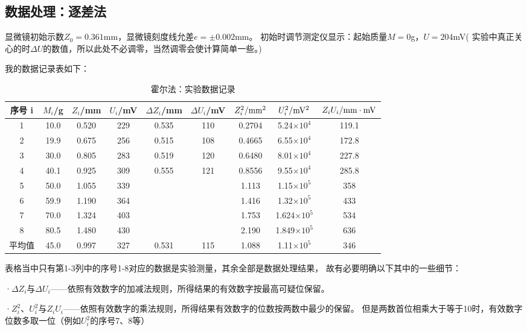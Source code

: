 \documentclass[11pt]{article}
\begin{document}
\subsection{数据处理：逐差法}

显微镜初始示数$Z_0=0.361$mm，显微镜刻度线允差$e=\pm 0.002$mm。
初始时调节测定仪显示：起始质量$M=0$g，$U=204$mV(
    实验中真正关心的时$\Delta U$的数值，所以此处不必调零，当然调零会使计算简单一些。)

我的数据记录表如下：
\begin{table}[H]
    \centering
    \begin{tabular}{ccccccccc}
        \toprule
        序号 i &  $M_i$/g  & $Z_i$/mm & $U_i$/mV& $\Delta Z_i$/mm 
        &$\Delta U_i$/mV &  $Z_i^2/\rm mm^2$ 
         &$U_i^2/\rm mV^2$ & $Z_iU_i/\rm mm\cdot mV$  \\ 
        \midrule
        1 & 10.0  & 0.520  & 229 & 0.535 & 110 & 0.2704 & 5.24$\times 10^4$  & 119.1 \\ 
        2 & 19.9  & 0.675  & 256 & 0.515 & 108 & 0.4665 &  6.55$\times 10^4$ & 172.8 \\ 
        3 & 30.0  & 0.805  & 283 & 0.519 & 120 & 0.6480 & 8.01$\times 10^4$ & 227.8 \\ 
        4 & 40.1  & 0.925  & 309 & 0.555 & 121 & 0.8556 & 9.55$\times 10^4$ & 285.8 \\ 
        5 & 50.0  & 1.055  & 339 & ~ & ~ & 1.113 & 1.15$\times 10^5$& 358 \\ 
        6 & 59.9  & 1.190  & 364 & ~ & ~ & 1.416 & 1.32$\times 10^5$ & 433 \\ 
        7 & 70.0  & 1.324  & 403 & ~ & ~ & 1.753 & 1.624$\times 10^5$  & 534 \\ 
        8 & 80.5  & 1.480  & 430 & ~ & ~ & 2.190 & 1.849$\times 10^5$ & 636 \\ 
        平均值 & 45.0 & 0.997 & 327 & 0.531 & 115 & 1.088& 1.11$\times 10^5$ & 346 \\ 
        \bottomrule
    \end{tabular}
    \caption{霍尔法：实验数据记录}
\end{table}

表格当中只有第1-3列中的序号1-8对应的数据是实验测量，其余全部是数据处理结果，
故有必要明确以下其中的一些细节：

·$\Delta Z_i$与$\Delta U_i$——依照有效数字的加减法规则，所得结果的有效数字按最高可疑位保留。

·$Z_i^2$、$U_i^2$与$Z_iU_i$——依照有效数字的乘法规则，所得结果有效数字的位数按两数中最少的保留。
但是两数首位相乘大于等于10时，有效数字位数多取一位（例如$U_i^2$的序号7、8等）
\end{document}
